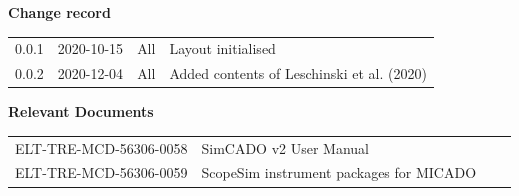 \documentclass[a4paper,twoside,11pt]{article}
\begin{document}

\dmdmaketitle



\begin{center}
  \textbf{Change record}

  \tabletail{\hline}

  \begin{supertabular}{|l|l|l|l|}
   0.0.1 & 2020-10-15 & All & Layout initialised \\
   0.0.2 & 2020-12-04 & All & Added contents of Leschinski et al. (2020) \\
   \hline
  \end{supertabular}

\end{center}

\begin{center}
  \textbf{Relevant Documents}

  \tabletail{\hline}

  \begin{supertabular}{|l|l|l|l|}
   ELT-TRE-MCD-56306-0058 & SimCADO v2 User Manual \\
   ELT-TRE-MCD-56306-0059 & ScopeSim instrument packages for MICADO \\
   \hline
  \end{supertabular}

\end{center}
\end{document}
